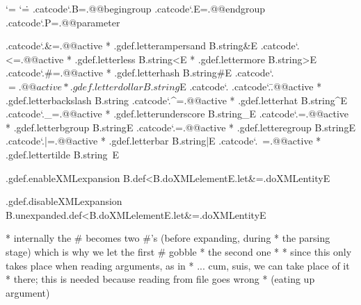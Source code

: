 \newtoks\everyenableXML



\newif\ifalwaysreduceXMLtokens

\let\alwaysreduceXMLtokens\alwaysreduceXMLtokenstrue

\bgroup
\catcode`\*=\@@comment
\catcode`\.=\@@escape
.catcode`.B=.@@begingroup
.catcode`.E=.@@endgroup
.catcode`.P=.@@parameter

.catcode`.&=.@@active * .gdef.letterampersand  B.string&E
.catcode`.<=.@@active * .gdef.letterless       B.string<E
                      * .gdef.lettermore       B.string>E
.catcode`.#=.@@active * .gdef.letterhash       B.string#E
.catcode`.$=.@@active * .gdef.letterdollar     B.string$E
.catcode`.%
.catcode`.\=.@@active * .gdef.letterbackslash  B.string\E
.catcode`.^=.@@active * .gdef.letterhat        B.string^E
.catcode`._=.@@active * .gdef.letterunderscore B.string_E
.catcode`.{=.@@active * .gdef.letterbgroup     B.string{E
.catcode`.}=.@@active * .gdef.letteregroup     B.string}E
.catcode`.|=.@@active * .gdef.letterbar        B.string|E
.catcode`.~=.@@active * .gdef.lettertilde      B.string~E

.gdef.enableXMLexpansion
  B.def<B.doXMLelementE.let&=.doXMLentityE

.gdef.disableXMLexpansion
  B.unexpanded.def<B.doXMLelementE.let&=.doXMLentityE

* internally the # becomes two #'s (before expanding, during
* the parsing stage) which is why we let the first # gobble 
* the second one
*
* since this only takes place when reading arguments, as in 
* \startXMLdata ... cum, suis, we can take place of it 
* there; this is needed because reading from file goes wrong  
* (eating up argument) 

